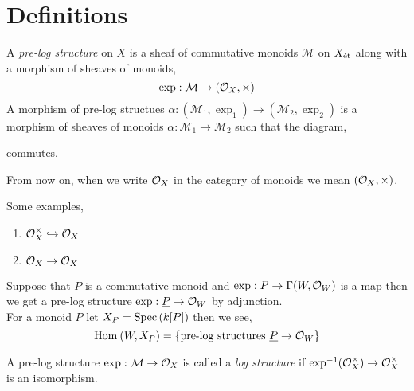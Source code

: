 \documentclass[12pt]{article}
\begin{document}
\newcommand{\cM}{\mathcal{M}}
\newcommand{\cN}{\mathcal{N}}

\section{Definitions}

\begin{defn}
A \textit{pre-log structure} on $X$ is a sheaf of commutative monoids $\cM$ on $X_{\text{\'{e}t}}$ along with a morphism of sheaves of monoids,
\[ \exp : \cM \to (\struct{X}, \times) \]
A morphism of pre-log structues $\alpha : (\cM_1, \exp_1) \to (\cM_2, \exp_2)$ is a morphism of sheaves of monoids $\alpha : \cM_1 \to \cM_2$ such that the diagram,
\begin{center}
\end{center}
commutes.
\end{defn}

\begin{rmk}
From now on, when we write $\mathcal{O}_{X}$ in the category of monoids we mean $(\mathcal{O}_{X}, \times)$. 
\end{rmk}

\begin{example}
Some examples,
\begin{enumerate}
\item $\mathcal{O}_{X}^\times \hookrightarrow \mathcal{O}_{X}$
\item $\mathcal{O}_{X} \to \mathcal{O}_{X}$
\end{enumerate}
\end{example}

\begin{example}
Suppose that $P$ is a commutative monoid and $\exp : P \to \Gamma(W, \mathcal{O}_{W})$ is a map then we get a pre-log structure $\exp : \underline{P} \to \mathcal{O}_{W}$ by adjunction.
\bigskip\\
For a monoid $P$ let $X_P = \mathrm{Spec}\left( k[P] \right)$ then we see,
\[ \mathrm{Hom}_{} \left( W, X_P \right) = \{\text{pre-log structures } \underline{P} \to \mathcal{O}_{W} \} \]
\end{example}

\begin{defn}
A pre-log structure $\exp : \cM \to \struct{X}$ is called a \textit{log structure} if $\exp^{-1}(\mathcal{O}_{X}^\times) \to \mathcal{O}_{X}^\times$ is an isomorphism. 
\end{defn}
\end{document}
